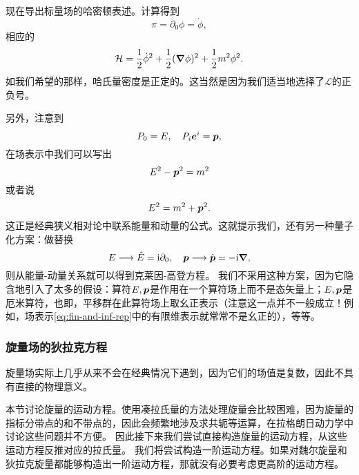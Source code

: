 \documentclass[hyperref, UTF8, a4paper]{ctexart}
\newcommand*{\ii}{\mathrm{i}}
\begin{document}
现在导出标量场的哈密顿表述。计算得到
\begin{equation}
    \pi = \partial_0 \phi = \dot{\phi},
\end{equation}
相应的
\begin{equation}
    \mathcal{H} = \frac{1}{2} \dot{\phi}^2 + \frac{1}{2} (\grad{\phi})^2 + \frac{1}{2} m^2 \phi^2.
\end{equation}
如我们希望的那样，哈氏量密度是正定的。这当然是因为我们适当地选择了$\mathcal{L}$的正负号。

另外，注意到 %
\[
    P_0 = E, \quad P_i \vb*{e}^i = \vb*{p},
\]
在场表示中我们可以写出
\[
    E^2 - \vb*{p}^2 = m^2
\]
或者说
\[
    E^2 = m^2 + \vb*{p}^2.
\]
这正是经典狭义相对论中联系能量和动量的公式。这就提示我们，还有另一种量子化方案：做替换
\[
    E \longrightarrow \hat{E} = \ii \partial_0, \quad \vb*{p} \longrightarrow \hat{\vb*{p}} = - \ii \grad,
\]
则从能量-动量关系就可以得到克莱因-高登方程。
我们不采用这种方案，因为它隐含地引入了太多的假设：算符$E, \vb*{p}$是作用在一个算符场上而不是态矢量上；$E,\vb*{p}$是厄米算符，也即，平移群在此算符场上取幺正表示（注意这一点并不一般成立！例如，场表示\eqref{eq:fin-and-inf-rep}中的有限维表示就常常不是幺正的），等等。

\subsubsection{旋量场的狄拉克方程}

旋量场实际上几乎从来不会在经典情况下遇到，因为它们的场值是复数，因此不具有直接的物理意义。

本节讨论旋量的运动方程。使用凑拉氏量的方法处理旋量会比较困难，因为旋量的指标分带点的和不带点的，因此会频繁地涉及求共轭等运算，在拉格朗日动力学中讨论这些问题并不方便。
因此接下来我们尝试直接构造旋量的运动方程，从这些运动方程反推对应的拉氏量。
我们将尝试构造一阶运动方程。如果对魏尔旋量和狄拉克旋量都能够构造出一阶运动方程，那就没有必要考虑更高阶的运动方程。
\end{document}
